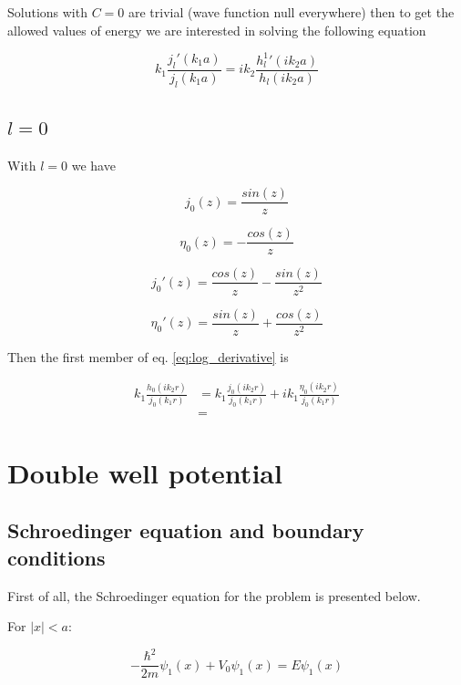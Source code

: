 \documentclass{article}
\begin{document}
Solutions with \( C = 0 \) are trivial (wave function null everywhere) then to get the allowed values of energy we are interested in solving the following equation

\begin{equation}
\label{eq:log_derivative}
k_1 \frac{j_l'(k_1a)}{j_l(k_1a)} = i k_2 \frac{{h_l^1}'(ik_2a)}{h_l(ik_2a)}
\end{equation}

\subsection{ \( l = 0 \) }

With \( l= 0 \) we have

\begin{equation}
j_0(z) = \frac{sin(z)}{z}
\end{equation}

\begin{equation}
\eta_0(z) = - \frac{cos(z)}{z}
\end{equation}

\begin{equation}
j_0'(z) = \frac{cos(z)}{z} -  \frac{sin(z)}{z^2}
\end{equation}

\begin{equation}
\eta_0'(z) = \frac{sin(z)}{z} + \frac{cos(z)}{z^2}
\end{equation}

Then the first member of eq. \eqref{eq:log_derivative} is

\begin{align}
k_1 \frac{h_0(ik_2r)}{j_0(k_1r)} & = k_1 \frac{j_0(ik_2r)}{j_0(k_1r)} + i k_1 \frac{\eta_0(ik_2r)}{j_0(k_1r)} \nonumber \\
& =
\end{align}

\section{Double well potential}

\subsection{Schroedinger equation and boundary conditions}
First of all, the Schroedinger equation for the problem is presented below.

For \(\left|x\right| < a\):

\begin{equation}
\label{eq:schr1}
-\frac{\hbar^2}{2m}\psi_{1}(x) + V_{0}\psi_{1}(x) = E\psi_{1}(x)
\end{equation}
\end{document}
